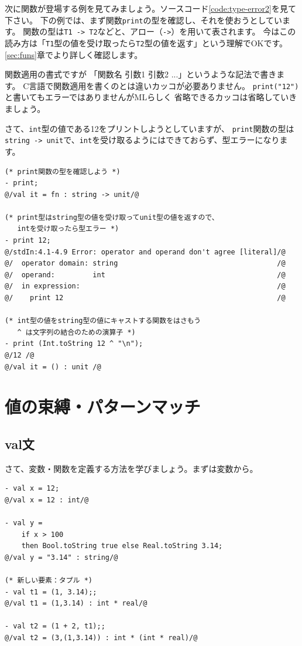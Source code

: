 \documentclass[11pt,a4paper]{article}
\begin{document}
次に関数が登場する例を見てみましょう。ソースコード\ref{code:type-error2}を見て下さい。
下の例では、まず関数\lstinline{print}の型を確認し、それを使おうとしています。
関数の型は\lstinline{T1 -> T2}などと、アロー（\lstinline{->}）を用いて表されます。
今はこの読み方は「\lstinline{T1}型の値を受け取ったら\lstinline{T2}型の値を返す」という理解でOKです。
\ref{sec:funs}章でより詳しく確認します。

関数適用の書式ですが 「関数名 引数1 引数2 ...」というような記法で書きます。
C言語で関数適用を書くのとは違いカッコが必要ありません。
\lstinline{print("12")}と書いてもエラーではありませんがMLらしく
省略できるカッコは省略していきましょう。

さて、\lstinline{int}型の値である12をプリントしようとしていますが、
\lstinline{print}関数の型は\lstinline{string -> unit}で、\lstinline{int}を受け取るようにはできておらず、型エラーになります。

\begin{lstlisting}[caption=型エラー２,label=code:type-error2]
(* print関数の型を確認しよう *)
- print;
@/val it = fn : string -> unit/@

(* print型はstring型の値を受け取ってunit型の値を返すので、
   intを受け取ったら型エラー *)
- print 12;
@/stdIn:4.1-4.9 Error: operator and operand don't agree [literal]/@
@/  operator domain: string                                      /@
@/  operand:         int                                         /@
@/  in expression:                                               /@
@/    print 12                                                   /@

(* int型の値をstring型の値にキャストする関数をはさもう
   ^ は文字列の結合のための演算子 *)
- print (Int.toString 12 ^ "\n");
@/12 /@
@/val it = () : unit /@
\end{lstlisting}


\section{値の束縛・パターンマッチ}
\subsection{val文}
さて、変数・関数を定義する方法を学びましょう。まずは変数から。
\begin{lstlisting}[caption={val文}, label={code:vals}]
- val x = 12;
@/val x = 12 : int/@

- val y =
    if x > 100
    then Bool.toString true else Real.toString 3.14;
@/val y = "3.14" : string/@

(* 新しい要素：タプル *)
- val t1 = (1, 3.14);;
@/val t1 = (1,3.14) : int * real/@

- val t2 = (1 + 2, t1);;
@/val t2 = (3,(1,3.14)) : int * (int * real)/@
\end{lstlisting}
\end{document}
